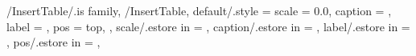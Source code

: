 %
%
%
%
%


\pgfkeys
{
  /InsertTable/.is family, /InsertTable,
  default/.style =
  {
    scale = 0.0,
    caption = \empty,
    label = \empty,
    pos = top, %
  },
  scale/.estore in = \TmpValueScale,
  caption/.estore in = \TmpValueCaption,
  label/.estore in = \TmpValueLabel,
  pos/.estore in = \TmpValuePosition,
} %

\newcommand{\DisplayTableContent}[2][\empty]
{
  \ifthenelse{\equal{#1}{0.0}}%
  {%
    \begin{minipage}[c]{\textwidth}
    \colorbox{white}{\makebox[\textwidth]{#2}}
    \end{minipage}
  }{%
    \begin{minipage}[c]{\textwidth}
    \colorbox{white}{\makebox[\textwidth]{%
    \resizebox{#1\paperwidth}{!}{#2}}}
    \end{minipage}
  }%
} %

\newcommand{\InsertTable}[2][\empty]
{
  \pgfkeys{/InsertTable, default, #1}%
  \begin{table}[H]
    \colorbox{white}{\makebox[\textwidth]{
    \begin{minipage}[c]{\textwidth}
    \ifthenelse{\equal{\TmpValuePosition}{top}}%
    {%
      \SetImageCaptionAndLabel{\TmpValueCaption}{\TmpValueLabel}%
      \DisplayTableContent[\TmpValueScale]{#2}%
    }{%
      \DisplayTableContent[\TmpValueScale]{#2}%
      \SetImageCaptionAndLabel{\TmpValueCaption}{\TmpValueLabel}%
    }%
    \end{minipage}
    }}%
  \end{table}
} %

